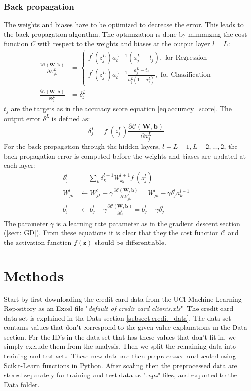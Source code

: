 \documentclass[12pt,a4paper,english]{article}
\begin{document}
\subsubsection{Back propagation}
\label{subsect:back_prop}
The weights and biases have to be optimized to decrease the error. This leads to the back propagation algorithm. The optimization is done by minimizing the cost function $C$ with respect to the weights and biases at the output layer $l=L$:
\begin{align*}
\frac{\partial \mathcal{C}(\textbf{W},\textbf{b})}{\partial W^L_{jk}}&=\begin{cases*}
f^{\prime}(z^L_j)a_k^{L-1}(a^L_j-t_j), \text{ for Regression}\\
f^{\prime}(z^L_j)a_k^{L-1}\frac{a^L_j-t_j}{a^L_j(1-a^L_j)}, \text{ for Classification}
\end{cases*}\\
\frac{\partial \mathcal{C}(\textbf{W},\textbf{b})}{\partial b^L_{j}}&=\delta_j^L
\end{align*}
$t_j$ are the targets as in the accuracy score equation \ref{eq:accuracy_score}. The output error $\delta^L$ is defined as:
\begin{equation*}
\delta_j^L=f^{\prime}(z^L_j)\frac{\partial \mathcal{C}(\textbf{W},\textbf{b})}{\partial a^L_j}
\end{equation*}
For the back propagation through the hidden layers, $l=L-1,L-2,...,2$, the back propagation error is computed before the weights and biases are updated at each layer:
\begin{align*}
\delta_j^l&=\sum_{k}\delta_k^{l+1}W_{kj}^{l+1}f^{\prime}(z^l_j)\\
W_{jk}^l&\leftarrow W_{jk}^l-\gamma\frac{\partial \mathcal{C}(\textbf{W},\textbf{b})}{\partial W_{jk}^l}= W_{jk}^l -\gamma \delta_j^la_k^{l-1} \\
b^l_j&\leftarrow b^l_j-\gamma\frac{\partial \mathcal{C}(\textbf{W},\textbf{b})}{\partial b_j^l}=b^l_j-\gamma\delta_j^l
\end{align*}
The parameter $\gamma$ is a learning rate parameter as in the gradient descent section (\ref{sect: GD}). From these equations it is clear that they the cost function $\mathcal{C}$ and the activation function $f(\textbf{z})$ should be differentiable.

\section{Methods}
Start by first downloading the credit card data from the UCI Machine Learning Repository \cite{UCI} as an Excel file "\textit{default of credit card clients.xls}". The credit card data set is explained in the Data section \ref{subsect:credit_data}. The data set contains values that don't correspond to the given value explanations in the Data section. For the ID's in the data set that has these values that don't fit in, we simply exclude them from the analysis. Then we split the remaining data into training and test sets. These new data are then preprocessed and scaled using Scikit-Learn functions in Python. After scaling then the preprocessed data are stored separately for training and test data as "\textit{.npz}" files, and exported to the Data folder.
\end{document}
